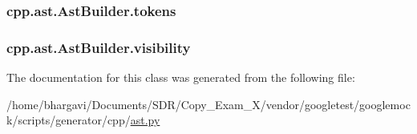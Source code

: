 \subsubsection[{\texorpdfstring{tokens}{tokens}}]{\setlength{\rightskip}{0pt plus 5cm}cpp.\+ast.\+Ast\+Builder.\+tokens}\hypertarget{classcpp_1_1ast_1_1_ast_builder_a1b21f8bef712e91862ccb6b1147cab0d}{}\label{classcpp_1_1ast_1_1_ast_builder_a1b21f8bef712e91862ccb6b1147cab0d}
\subsubsection[{\texorpdfstring{visibility}{visibility}}]{\setlength{\rightskip}{0pt plus 5cm}cpp.\+ast.\+Ast\+Builder.\+visibility}\hypertarget{classcpp_1_1ast_1_1_ast_builder_a2f16b19846c405101235432d2666b614}{}\label{classcpp_1_1ast_1_1_ast_builder_a2f16b19846c405101235432d2666b614}


The documentation for this class was generated from the following file\+:\begin{DoxyCompactItemize}
\item 
/home/bhargavi/\+Documents/\+S\+D\+R/\+Copy\+\_\+\+Exam\+\_\+X/vendor/googletest/googlemock/scripts/generator/cpp/\hyperlink{ast_8py}{ast.\+py}\end{DoxyCompactItemize}
